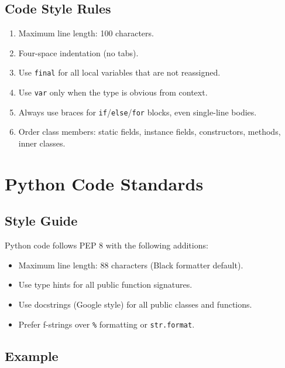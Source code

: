 \documentclass[
    language=english,
    doctype=standard,
    institution=none,
    titlestyle=book,
    oneside,
]{../../omnilatex}
\begin{document}
\section{Code Style Rules}

\begin{enumerate}
    \item Maximum line length: 100 characters.
    \item Four-space indentation (no tabs).
    \item Use \texttt{final} for all local variables that are not
        reassigned.
    \item Use \texttt{var} only when the type is obvious from context.
    \item Always use braces for \texttt{if}/\texttt{else}/\texttt{for}
        blocks, even single-line bodies.
    \item Order class members: static fields, instance fields,
        constructors, methods, inner classes.
\end{enumerate}

\chapter{Python Code Standards}
\label{sec:python}

\section{Style Guide}

Python code follows PEP 8 with the following additions:

\begin{itemize}
    \item Maximum line length: 88 characters (Black formatter default).
    \item Use type hints for all public function signatures.
    \item Use docstrings (Google style) for all public classes and
        functions.
    \item Prefer f-strings over \texttt{\%} formatting or
        \texttt{str.format}.
\end{itemize}

\section{Example}
\end{document}

